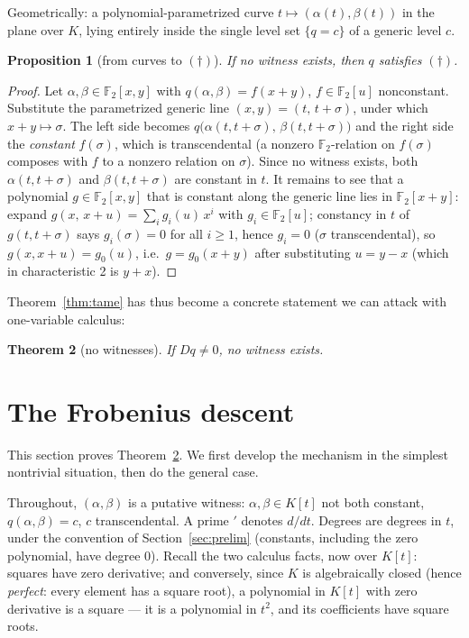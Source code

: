\documentclass[11pt]{article}
\newtheorem{theorem}{Theorem}[section]
\newtheorem{proposition}[theorem]{Proposition}
\theoremstyle{definition}
\theoremstyle{remark}
\newcommand{\F}{\mathbb{F}}
\begin{document}
Geometrically: a polynomial-parametrized curve
$t \mapsto (\alpha(t), \beta(t))$ in the plane over $K$, lying
entirely inside the single level set $\{q = c\}$ of a generic level
$c$.

\begin{proposition}[from curves to $(\dagger)$]\label{prop:bridge}
If no witness exists, then $q$ satisfies $(\dagger)$.
\end{proposition}

\begin{proof}
Let $\alpha, \beta \in \F_2[x,y]$ with $q(\alpha,\beta) = f(x+y)$,
$f \in \F_2[u]$ nonconstant.  Substitute the parametrized generic line
$(x, y) = (t,\, t + \sigma)$, under which $x + y \mapsto \sigma$.  The
left side becomes
$q\bigl(\alpha(t, t{+}\sigma),\, \beta(t, t{+}\sigma)\bigr)$ and the
right side the \emph{constant} $f(\sigma)$, which is transcendental
(a nonzero $\F_2$-relation on $f(\sigma)$ composes with $f$ to a
nonzero relation on $\sigma$).  Since no witness exists, both
$\alpha(t, t{+}\sigma)$ and $\beta(t, t{+}\sigma)$ are constant in
$t$.  It remains to see that a polynomial $g \in \F_2[x,y]$ that is
constant along the generic line lies in $\F_2[x{+}y]$: expand
$g(x,\, x + u) = \sum_i g_i(u)\, x^i$ with $g_i \in \F_2[u]$;
constancy in $t$ of $g(t, t+\sigma)$ says $g_i(\sigma) = 0$ for all
$i \geq 1$, hence $g_i = 0$ ($\sigma$ transcendental), so
$g(x, x+u) = g_0(u)$, i.e.\ $g = g_0(x + y)$ after substituting
$u = y - x$ (which in characteristic 2 is $y + x$).
\end{proof}

Theorem~\ref{thm:tame} has thus become a concrete statement we can
attack with one-variable calculus:

\begin{theorem}[no witnesses]\label{thm:descent}
If $Dq \neq 0$, no witness exists.
\end{theorem}

\section{The Frobenius descent}\label{sec:descent}

This section proves Theorem~\ref{thm:descent}.  We first develop the
mechanism in the simplest nontrivial situation, then do the general
case.

Throughout, $(\alpha, \beta)$ is a putative witness:
$\alpha, \beta \in K[t]$ not both constant, $q(\alpha,\beta) = c$,
$c$ transcendental.  A prime $'$ denotes $d/dt$.  Degrees are degrees
in $t$, under the convention of Section~\ref{sec:prelim} (constants,
including the zero polynomial, have degree $0$).  Recall the two
calculus facts, now over $K[t]$: squares have zero derivative; and
conversely, since $K$ is algebraically closed (hence \emph{perfect}:
every element has a square root), a polynomial in $K[t]$ with zero
derivative is a square --- it is a polynomial in $t^2$, and its
coefficients have square roots.
\end{document}

